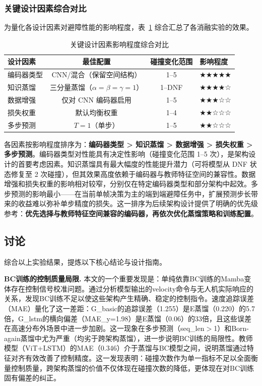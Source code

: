 \documentclass[12pt,a4paper]{article}
\numberwithin{equation}{section}
\numberwithin{figure}{section}
\numberwithin{table}{section}
\begin{document}
\subsubsection{关键设计因素综合对比}
\label{sec:factor-ranking}

为量化各设计因素对避障性能的影响程度，表~\ref{tab:factor-impact} 综合汇总了各消融实验的效果。

\begin{table}[H]
\centering
\caption{关键设计因素影响程度综合对比}
\label{tab:factor-impact}
\begin{tabular}{lccl}
\toprule
设计因素 & 最佳配置 & 碰撞变化范围 & 影响程度 \\
\midrule
编码器类型 & CNN/混合（保留空间结构） & 1--5 & ★★★★★ \\
知识蒸馏 & 三分量蒸馏（$\alpha=\beta=\gamma=1$） & 1--DNF & ★★★★☆ \\
数据增强 & 仅对 CNN 编码器启用 & 1--5 & ★★★☆☆ \\
损失权重 & 默认均衡权重 & 1--4 & ★★☆☆☆ \\
多步预测 & $T=1$（单步） & 1--5 & ★★☆☆☆ \\
\bottomrule
\end{tabular}
\end{table}

各因素按影响程度排序为：\textbf{编码器类型 > 知识蒸馏 > 数据增强 > 损失权重 > 多步预测}。编码器类型对性能具有决定性影响（碰撞变化范围 1--5 次），是架构设计的首要考虑因素。知识蒸馏具有最大幅度的性能提升潜力（可将模型从 DNF 状态修复至 2 次碰撞），但其效果高度依赖于编码器与教师特征空间的兼容性。数据增强和损失权重的影响相对较窄，分别仅在特定编码器类型和部分架构中起效。多步预测的影响最小——在当前单帧决策为主的端到端避障任务中，扩展预测步长带来的收益难以弥补单步精度的损失。这一排序为后续架构设计提供了明确的优先级参考：\textbf{优先选择与教师特征空间兼容的编码器，再依次优化蒸馏策略和训练配置}。

\subsection{讨论}
\label{sec:discussion}

综合以上实验结果，提炼以下核心结论与设计指南。

\textbf{BC训练的控制质量局限.} 本文的一个重要发现是：单纯依靠BC训练的Mamba变体存在控制信号校准问题。通过分析模型输出的velocity命令与无人机实际响应的关系，发现BC训练不足以使这些架构产生精确、稳定的控制指令。速度追踪误差（MAE）量化了这一差距：G\_basic的追踪误差（1.255）是E蒸馏（0.220）的5.7倍，G\_lstm的横向偏差（MAE\_y=1.98）是E蒸馏（0.06）的33倍，且这些误差在高速分布外场景中进一步加剧。这一现象在多步预测（seq\_len$>$1）和Born-again蒸馏中尤为严重（均劣于跨架构蒸馏），进一步说明BC训练的局限性。教师模型（ViT+LSTM）的MAE（0.346）介于蒸馏与BC模型之间，说明蒸馏通过特征对齐有效改善了控制精度。这一发现表明：碰撞次数作为单一指标不足以全面衡量控制质量，跨架构蒸馏的价值不仅体现在碰撞次数的降低，更体现在对BC训练固有偏差的纠正。
\end{document}
